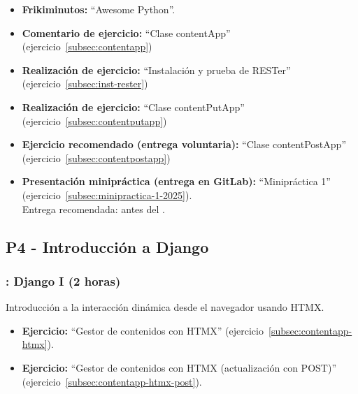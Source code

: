 \documentclass[a4paper,12pt]{article}
\begin{document}
\begin{itemize}
\item \textbf{Frikiminutos:} ``Awesome Python''.
\item \textbf{Comentario de ejercicio:}  ``Clase contentApp'' (ejercicio~\ref{subsec:contentapp})
\item \textbf{Realización de ejercicio:}  ``Instalación y prueba de RESTer'' (ejercicio~\ref{subsec:inst-rester})
\item \textbf{Realización de ejercicio:}  ``Clase contentPutApp'' (ejercicio~\ref{subsec:contentputapp})
\item \textbf{Ejercicio recomendado (entrega voluntaria):} ``Clase contentPostApp'' (ejercicio~\ref{subsec:contentpostapp})
\item \textbf{Presentación minipráctica (entrega en GitLab):} ``Minipráctica 1'' (ejercicio~\ref{subsec:minipractica-1-2025}). \\
    Entrega recomendada: antes del \juevesH.
\end{itemize}



\subsection{P4 - Introducción a Django}

\subsubsection{\juevesG: Django I (2 horas)}
\label{cal:juevesG}

Introducción a la interacción dinámica desde el navegador usando HTMX.

\begin{itemize}
\item \textbf{Ejercicio:} ``Gestor de contenidos con HTMX'' (ejercicio~\ref{subsec:contentapp-htmx}).
\item \textbf{Ejercicio:} ``Gestor de contenidos con HTMX (actualización con POST)'' (ejercicio~\ref{subsec:contentapp-htmx-post}).
\end{itemize}
\end{document}
